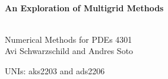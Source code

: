 \begin{titlepage}
\begin{center}




\HRule \\[0.4cm]
{ \huge \bfseries An Exploration of Multigrid Methods \\[0.4cm] }

\HRule \\[1.5cm]

\LARGE Numerical Methods for PDEs 4301\\[0.5cm]


Avi Schwarzschild and Andres Soto \\


\begin{minipage}{0.4\textwidth}
\end{minipage}

\vfill

{\small UNIs: aks2203 and ads2206}


\end{center}
\end{titlepage}